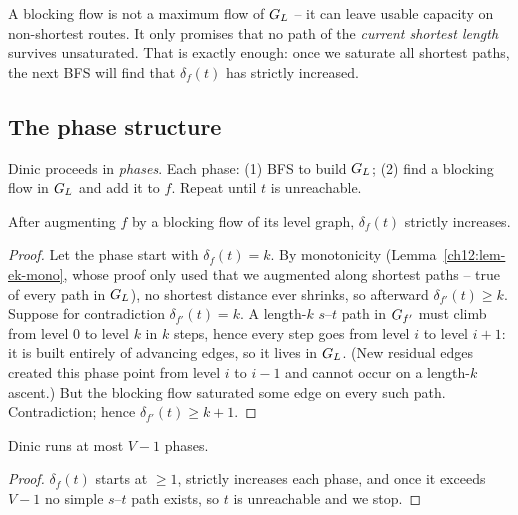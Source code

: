 \begin{intuitionbox}
A blocking flow is not a maximum flow of $G_L$ -- it can leave usable capacity
on non-shortest routes. It only promises that no path of the \emph{current
shortest length} survives unsaturated. That is exactly enough: once we saturate
all shortest paths, the next BFS will find that $\delta_f(t)$ has strictly
increased.
\end{intuitionbox}

\subsection{The phase structure}

Dinic proceeds in \emph{phases}. Each phase: (1) BFS to build $G_L$; (2) find a
blocking flow in $G_L$ and add it to $f$. Repeat until $t$ is unreachable.

\begin{lemma}
\label{ch12:lem-dinic-phase}
After augmenting $f$ by a blocking flow of its level graph, $\delta_f(t)$ strictly
increases.
\end{lemma}

\begin{proof}
Let the phase start with $\delta_f(t)=k$. By monotonicity
(Lemma~\ref{ch12:lem-ek-mono}, whose proof only used that we augmented along
shortest paths -- true of every path in $G_L$), no shortest distance ever
shrinks, so afterward $\delta_{f'}(t)\ge k$. Suppose for contradiction
$\delta_{f'}(t)=k$. A length-$k$ $s$--$t$ path in $G_{f'}$ must climb from level
$0$ to level $k$ in $k$ steps, hence every step goes from level $i$ to level
$i+1$: it is built entirely of advancing edges, so it lives in $G_L$. (New
residual edges created this phase point from level $i$ to $i-1$ and cannot occur on
a length-$k$ ascent.) But the blocking flow saturated some edge on every such
path. Contradiction; hence $\delta_{f'}(t)\ge k+1$.
\end{proof}

\begin{corollary}
\label{ch12:cor-dinic-phases}
Dinic runs at most $V-1$ phases.
\end{corollary}

\begin{proof}
$\delta_f(t)$ starts at $\ge 1$, strictly increases each phase, and once it
exceeds $V-1$ no simple $s$--$t$ path exists, so $t$ is unreachable and we stop.
\end{proof}


